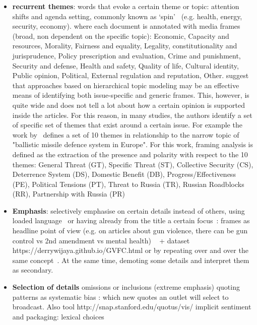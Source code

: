 \begin{itemize}
    \item \textbf{recurrent themes}: words that evoke a certain theme or topic: attention shifts and agenda setting, commonly known as ‘spin’~\cite{tsur2015frame} (e.g. health, energy, security, economy).
    \cite{card2015media} where each document is annotated with media frames (broad, non dependent on the specific topic): Economic, Capacity and resources, Morality, Fairness and equality, Legality, constitutionality and jurisprudence, Policy prescription and evaluation, Crime and punishment, Security and defense, Health and safety, Quality of life, Cultural identity, Public opinion, Political, External regulation and reputation, Other.
    \citet{boydstun2013making} suggest that approaches based on hierarchical topic modeling may be an effective means of identifying both issue-specific and generic frames.
    This, however, is quite wide and does not tell a lot about how a certain opinion is supported inside the articles. For this reason, in many studies, the authors identify a set of specific set of themes that exist around a certain issue. For example the work by~\citet{morstatter2018identifying} defines a set of 10 themes in relationship to the narrow topic of "ballistic missile defence system in Europe". For this work, framing analysis is defined as the extraction of the presence and polarity with respect to the 10 themes: General Threat (GT), Specific Threat (ST), Collective Security (CS), Deterrence System (DS), Domestic Benefit (DB), Progress/Effectiveness (PE), Political Tensions (PT), Threat to Russia (TR), Russian Roadblocks (RR), Partnership with Russia (PR)
    
    
    \item \textbf{Emphasis}: selectively emphasise on certain details instead of others, using loaded language~\cite{TODO}
    or having already from the title a certain focus~\cite{TODO}: frames as headline point of view (e.g. on articles about gun violence, there can be gun control vs 2nd amendment vs mental health) ~\cite{liu2019detecting} + dataset https://derrywijaya.github.io/GVFC.html
    or by repeating over and over the same concept~\cite{TODO}. At the same time, demoting some details and interpret them as secondary.
    
    \item \textbf{Selection of details} omissions or inclusions (extreme emphasis)
    quoting patterns as systematic bias \cite{niculae2015quotus}: which new quotes an outlet will select to broadcast. Also tool http://snap.stanford.edu/quotus/vis/
    implicit sentiment and packaging: lexical choices \cite{greene2009more}
    

\end{itemize}
